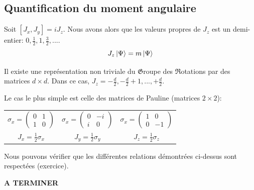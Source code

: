 \documentclass[../notesdecours.tex]{subfiles}
\begin{document}
\subsection{Quantification du moment angulaire}
\begin{theorem}
Soit $[J_x,J_y] = iJ_z$. Nous avons alors que les valeurs propres de $J_z$ est un demi-entier: $0,\frac{1}{2}, 1, \frac{3}{2}, ...$.
\begin{equation*}
J_z \ket{\Psi} = m\ket{\Psi}
\end{equation*}
\end{theorem}
\begin{theorem}
Il existe une représentation non triviale du $\mathfrak{G}$roupe des $\mathfrak{R}$otations par des matrices $d\times d$. Dans ce cas, $J_z = -\frac{d}{2}, -\frac{d}{2}+1,...,+\frac{d}{2}$.
\end{theorem}
\begin{exemple}
Le cas le plus simple est celle des matrices de Pauline (matrices $2\times 2$):
\begin{center}
\begin{tabular}{c|c|c}
$\sigma_x = \begin{pmatrix}
0 & 1\\
1 & 0
\end{pmatrix}$ & $\sigma_x = \begin{pmatrix}
0 & -i\\
i & 0
\end{pmatrix}$ & $\sigma_x = \begin{pmatrix}
1 & 0\\
0 & -1
\end{pmatrix}$\\
$J_x = \frac{1}{2}\sigma_x$ & $J_y = \frac{1}{2}\sigma_y$ & $J_z = \frac{1}{2}\sigma_z$
\end{tabular}
\end{center}
Nous pouvons vérifier que les différentes relations démontrées ci-dessus sont respectées (exercice).
\end{exemple}

\color{red}
\textbf{A TERMINER}
\end{document}
